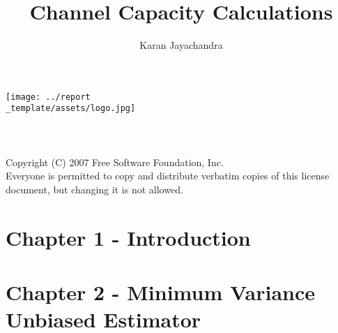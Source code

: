 \documentclass[12pt]{article}
\title{Channel Capacity Calculations}
\author{Karan Jayachandra}
\affil{Personal Archive}
\begin{document}

\makeatletter
    \begin{titlepage}
        \begin{center}
            \texttt{[image: ../report\\\_template/assets/logo.jpg]}\\[4ex]
            {\huge \bfseries \@title }\\[2ex]
            {\LARGE \@author}\\[30ex] 
            {\large \@date} \\[8ex]
            {Copyright (C) 2007 Free Software Foundation, Inc. \\ [2ex] Everyone is permitted to copy and distribute verbatim copies
            of this license document, but changing it is not allowed.}
        \end{center}
    \end{titlepage}
\makeatother
\thispagestyle{empty}
\newpage

\setcounter{page}{1}

\thispagestyle{fancy}

\section{Chapter 1 - Introduction}


\section{Chapter 2 - Minimum Variance Unbiased Estimator}

\end{document}
